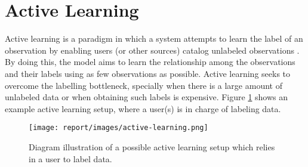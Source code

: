 \section{Active Learning} \label{sect:theory:active-learning}

Active learning is a paradigm in which a system attempts to learn the label of an observation by enabling users (or other sources) catalog unlabeled observations \cite{report:active-learning}. By doing this, the model aims to learn the relationship among the observations and their labels using as few observations as possible. Active learning seeks to overcome the labelling bottleneck, specially when there is a large amount of unlabeled data or when obtaining such labels is expensive. Figure \ref{fig:active-learning} shows an example active learning setup, where a user(s) is in charge of labeling data.

\begin{figure}[H]
  \centering
  \texttt{[image: report/images/active-learning.png]}
  \caption{Diagram illustration of a possible active learning setup which relies in a user to label data.}
  \label{fig:active-learning}
\end{figure}